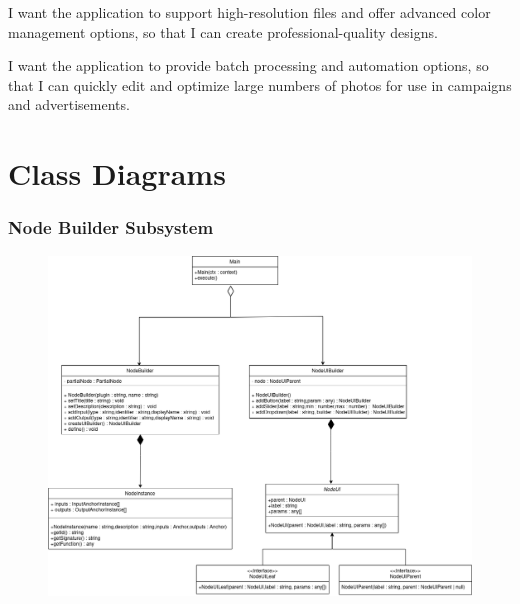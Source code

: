 \documentclass[11pt,a4paper]{article}
\begin{document}
I want the application to support high-resolution files and offer advanced color
management options, so that I can create professional-quality designs.

I want the application to provide batch processing and automation options, so
that I can quickly edit and optimize large numbers of photos for use in
campaigns and advertisements.

\pagebreak

\section*{Class Diagrams}

\subsubsection*{Node Builder Subsystem}
\begin{figure}[htbp]
    \centering
    \includegraphics[width=1.0\textwidth]{../diagramPng/Builder-subsystem.png}
\end{figure}

\clearpage

\end{document}

